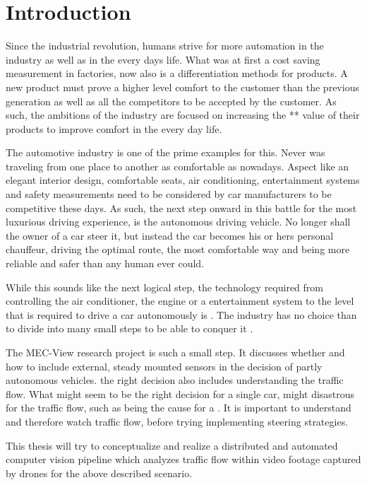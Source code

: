 \chapter{Introduction}

Since the industrial revolution, humans strive for more automation in the industry as well as in the every days life.
What was at first a cost saving measurement in factories, now also is a differentiation methods for products.
A new product must prove a higher level comfort to the customer than the previous generation as well as all the competitors to be accepted by the customer.
As such, the ambitions of the industry are focused on increasing the ** value of their products to improve comfort in the every day life.

The automotive industry is one of the prime examples for this.
Never was traveling from one place to another as comfortable as nowadays.
Aspect like an elegant interior design, comfortable seats, air conditioning, entertainment systems and safety measurements need to be considered by car manufacturers to be competitive these days. 
As such, the next step onward in this battle for the most luxurious driving experience, is the autonomous driving vehicle.
No longer shall the owner of a car steer it, but instead the car becomes his or hers personal chauffeur, driving the optimal route, the most comfortable way and being more reliable and safer than any human ever could.

While this sounds like the next logical step, the technology required from controlling the air conditioner, the engine or a entertainment system to the level that is required to drive a car autonomously is .
The industry has no choice than to divide into many small steps to be able to conquer it .

The MEC-View research project is such a small step.
It discusses whether and how to include external, steady mounted sensors in the decision  of partly autonomous vehicles.
 the right decision also includes understanding the traffic flow.
What might seem to be the right decision for a single car, might disastrous for the traffic flow, such as being the cause for a .
It is important to understand and therefore watch traffic flow, before trying implementing steering strategies.

This thesis will try to conceptualize and realize a distributed and automated computer vision pipeline which analyzes traffic flow within video footage captured by drones for the above described scenario.



